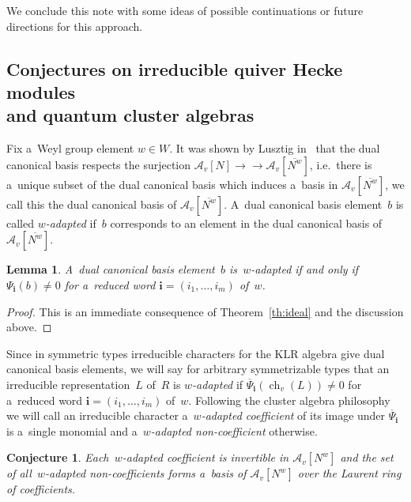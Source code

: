 \documentclass[pdftex]{sigma}
\newcommand{\onto}{\to\!\!\!\!\!\to}
\numberwithin{equation}{section}
\newtheorem{Conjecture}[Theorem]{Conjecture}
\newtheorem{Lemma}[Theorem]{Lemma}
\begin{document}
We conclude this note with some ideas of possible continuations or future directions for this approach.

\subsection{Conjectures on irreducible quiver Hecke modules\\ and quantum cluster algebras}
Fix a~Weyl group element $w\in W$.
It was shown by Lusztig in~\cite{lusztig, lusztig3} that the dual canonical basis respects the surjection
$\mathcal{A}_v[N]\onto\mathcal{A}_v[\overline{N^w}]$, i.e.~there is a~unique subset of the dual canonical basis which
induces a~basis in $\mathcal{A}_v[\overline{N^w}]$, we call this the dual canonical basis of
$\mathcal{A}_v[\overline{N^w}]$.
A~dual canonical basis element~$b$ is called \emph{$w$-adapted} if~$b$ corresponds to an element in the dual canonical
basis of $\mathcal{A}_v[\overline{N^w}]$.
\begin{Lemma}
A~dual canonical basis element~$b$ is~$w$-adapted if and only if $\Psi_\mathbf{i}(b)\ne0$ for a~reduced word
$\mathbf{i}=(i_1,\ldots,i_m)$ of~$w$.
\end{Lemma}
\begin{proof}
This is an immediate consequence of Theorem~\ref{th:ideal} and the discussion above.
\end{proof}

Since in symmetric types irreducible characters for the KLR algebra give dual canonical basis elements, we will say for
arbitrary symmetrizable types that an irreducible representation~$L$ of~$R$ is \emph{$w$-adapted} if
$\overline\Psi_\mathbf{i}(\operatorname{ch}_v(L))\ne0$ for a~reduced word $\mathbf{i}=(i_1,\ldots,i_m)$ of~$w$.
Following the cluster algebra philosophy we will call an irreducible character a~\emph{$w$-adapted coefficient} of its
image under $\overline\Psi_\mathbf{i}$ is a~single monomial and a~\emph{$w$-adapted non-coefficient} otherwise.
\begin{Conjecture}
Each~$w$-adapted coefficient is invertible in $\mathcal{A}_v[N^w]$ and the set of all~$w$-adapted non-coefficients forms
a~basis of $\mathcal{A}_v[N^w]$ over the Laurent ring of coefficients.
\end{Conjecture}
\end{document}
